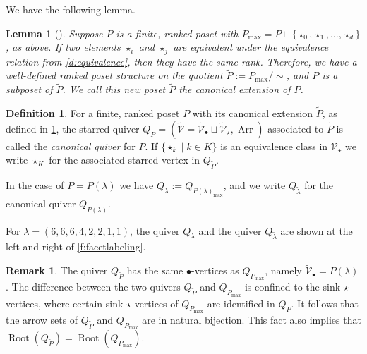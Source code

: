 \documentclass{amsart}
\newtheorem{lemma}[thm]{Lemma}
\theoremstyle{definition}
\newtheorem{defn}[thm]{Definition}
\newtheorem{remark}[thm]{Remark}
\numberwithin{equation}{section}
\newcommand{\V}{\mathcal{V}}
\newcommand{\Arr}{\operatorname{Arr}}
\newcommand{\Root}{\operatorname{Root}}
\begin{document}
We have the following lemma.
\begin{lemma}[{\cite[Lemma 5.8]{RWReflexive}}]\label{l:canonicalextension} Suppose $P$ is a finite, ranked poset with $P_{\max}=P\sqcup\{\star_0,\star_1,\dotsc,\star_d\}$, as above. If two elements $\star_i$ and $\star_j$ are equivalent under the equivalence relation from \cref{d:equivalence}, then they have the same rank. Therefore, we have a well-defined ranked poset structure on the quotient $\widetilde{P}:=P_{\max}/\sim$, and $P$ is a subposet of $\widetilde{P}$. We call this new poset $\widetilde{P}$ the  \emph{canonical extension} of $P$. 
\end{lemma}

\begin{defn}\label{d:canonicalquiver} For a finite, ranked poset $P$ with its canonical extension $\widetilde{P}$, as defined in \cref{l:canonicalextension}, the starred quiver $Q_{\widetilde{P}}=(\widetilde{\V}=\widetilde{\V}_\bullet\sqcup\widetilde{\V}_\star,\Arr)$ associated to $\widetilde{P}$ is called the \textit{canonical quiver} for $P$. If $\{\star_{k}\mid k\in K\}$ is an equivalence class in $\V_\star$ we write $\star_K$ for the associated starred vertex in $Q_{\widetilde{P}}$.

In the case of $P=P(\lambda)$ we have 
	$Q_\lambda:=
	Q_{P(\lambda)_{\max}}$,
	and we write $Q_{\widetilde{\lambda}}$ for the canonical quiver $Q_{\widetilde{P}(\lambda)}$. 
\end{defn}
	For $\lambda=(6,6,6,4,2,2,1,1)$,  
	the quiver $Q_\lambda$
	and the quiver $Q_{\widetilde{\lambda}}$ are shown at the left and 
	right of 
\cref{f:facetlabeling}.

\begin{remark}\label{r:arrowsandroots}  The quiver $Q_{\widetilde{P}}$ has the same $\bullet$-vertices as $Q_{P_{\max}}$, namely $\widetilde{\V}_\bullet=P(\lambda)$. 
The difference between the two quivers $Q_{\widetilde{P}}$ and  $Q_{P_{\max}}$ is confined to the sink $\star$-vertices, where certain sink $\star$-vertices of  $Q_{P_{\max}}$ are identified in $Q_{\widetilde{P}}$. It follows that the arrow sets of $Q_{\widetilde{P}}$ and  $Q_{P_{\max}}$ are in 
	natural bijection. This fact also implies that $\Root(Q_{\widetilde{P}})=\Root(Q_{P_{\max}})$. 
\end{remark} 
\end{document}
